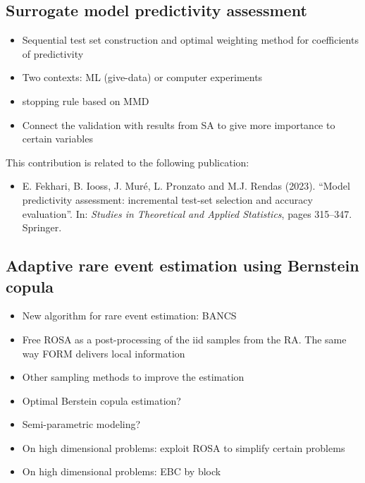 \subsection*{Surrogate model predictivity assessment}

\begin{itemize}
    \item Sequential test set construction and optimal weighting method for coefficients of predictivity
    \item Two contexts: ML (give-data) or computer experiments
\end{itemize}

\begin{itemize}
    \item stopping rule based on MMD
    \item Connect the validation with results from SA to give more importance to certain variables
\end{itemize}

This contribution is related to the following publication:
\begin{itemize}
    \footnotesize
    \item[\ding{125}] E. Fekhari, B. Iooss, J. Muré, L. Pronzato and M.J. Rendas (2023). ``Model predictivity assessment: incremental test-set selection and accuracy evaluation''. In: \textit{Studies in Theoretical and Applied Statistics}, pages 315--347. Springer.
\end{itemize}

\subsection*{Adaptive rare event estimation using Bernstein copula}

\begin{itemize}
    \item New algorithm for rare event estimation: BANCS
    \item Free ROSA as a post-processing of the iid samples from the RA. 
    The same way FORM delivers local information
\end{itemize}

\begin{itemize}
    \item Other sampling methods to improve the estimation
    \item Optimal Berstein copula estimation?
    \item Semi-parametric modeling?
    \item On high dimensional problems: exploit ROSA to simplify certain problems
    \item On high dimensional problems: EBC by block 
\end{itemize}

